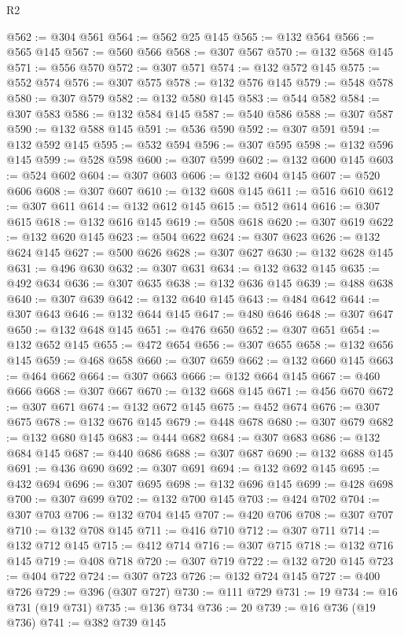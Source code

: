 \begin{lexlean}{R2}
\begin{coremodule}
@562 := @304 @561
@564 := @562 @25 @145
@565 := @132 @564
@566 := @565 @145
@567 := @560 @566
@568 := @307 @567
@570 := @132 @568 @145
@571 := @556 @570
@572 := @307 @571
@574 := @132 @572 @145
@575 := @552 @574
@576 := @307 @575
@578 := @132 @576 @145
@579 := @548 @578
@580 := @307 @579
@582 := @132 @580 @145
@583 := @544 @582
@584 := @307 @583
@586 := @132 @584 @145
@587 := @540 @586
@588 := @307 @587
@590 := @132 @588 @145
@591 := @536 @590
@592 := @307 @591
@594 := @132 @592 @145
@595 := @532 @594
@596 := @307 @595
@598 := @132 @596 @145
@599 := @528 @598
@600 := @307 @599
@602 := @132 @600 @145
@603 := @524 @602
@604 := @307 @603
@606 := @132 @604 @145
@607 := @520 @606
@608 := @307 @607
@610 := @132 @608 @145
@611 := @516 @610
@612 := @307 @611
@614 := @132 @612 @145
@615 := @512 @614
@616 := @307 @615
@618 := @132 @616 @145
@619 := @508 @618
@620 := @307 @619
@622 := @132 @620 @145
@623 := @504 @622
@624 := @307 @623
@626 := @132 @624 @145
@627 := @500 @626
@628 := @307 @627
@630 := @132 @628 @145
@631 := @496 @630
@632 := @307 @631
@634 := @132 @632 @145
@635 := @492 @634
@636 := @307 @635
@638 := @132 @636 @145
@639 := @488 @638
@640 := @307 @639
@642 := @132 @640 @145
@643 := @484 @642
@644 := @307 @643
@646 := @132 @644 @145
@647 := @480 @646
@648 := @307 @647
@650 := @132 @648 @145
@651 := @476 @650
@652 := @307 @651
@654 := @132 @652 @145
@655 := @472 @654
@656 := @307 @655
@658 := @132 @656 @145
@659 := @468 @658
@660 := @307 @659
@662 := @132 @660 @145
@663 := @464 @662
@664 := @307 @663
@666 := @132 @664 @145
@667 := @460 @666
@668 := @307 @667
@670 := @132 @668 @145
@671 := @456 @670
@672 := @307 @671
@674 := @132 @672 @145
@675 := @452 @674
@676 := @307 @675
@678 := @132 @676 @145
@679 := @448 @678
@680 := @307 @679
@682 := @132 @680 @145
@683 := @444 @682
@684 := @307 @683
@686 := @132 @684 @145
@687 := @440 @686
@688 := @307 @687
@690 := @132 @688 @145
@691 := @436 @690
@692 := @307 @691
@694 := @132 @692 @145
@695 := @432 @694
@696 := @307 @695
@698 := @132 @696 @145
@699 := @428 @698
@700 := @307 @699
@702 := @132 @700 @145
@703 := @424 @702
@704 := @307 @703
@706 := @132 @704 @145
@707 := @420 @706
@708 := @307 @707
@710 := @132 @708 @145
@711 := @416 @710
@712 := @307 @711
@714 := @132 @712 @145
@715 := @412 @714
@716 := @307 @715
@718 := @132 @716 @145
@719 := @408 @718
@720 := @307 @719
@722 := @132 @720 @145
@723 := @404 @722
@724 := @307 @723
@726 := @132 @724 @145
@727 := @400 @726
@729 := @396 (@307 @727)
@730 := @111 @729
@731 := 19
@734 := @16 @731 (@19 @731)
@735 := @136 @734
@736 := 20
@739 := @16 @736 (@19 @736)
@741 := @382 @739 @145

\end{coremodule}
\end{lexlean}
